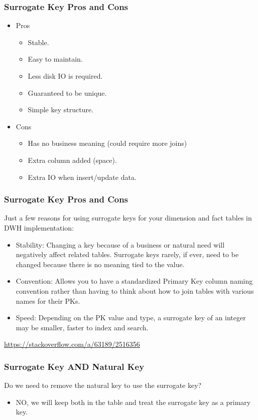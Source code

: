 \begin{frame}
	\frametitle{Surrogate Key Pros and Cons}

\hspace{.5cm}
\begin{itemize}
	\item	Pros
	\begin{itemize}
		\item Stable.
		\item Easy to maintain.
		\item Less disk IO is required.
		\item Guaranteed to be unique.
		\item Simple key structure.
	\end{itemize}	
\end{itemize}

\begin{itemize}
	\item	Cons
	\begin{itemize}
		\item Has no business meaning (could require more joins)
		\item Extra column added (space).
		\item Extra IO when insert/update data.
	\end{itemize}	
\end{itemize}	
\end{frame}

\begin{frame}
\frametitle{Surrogate Key Pros and Cons}
\vspace{.5cm}
Just a few reasons for using surrogate keys for your dimension and fact tables in DWH implementation:
	\begin{itemize}[<+->]
	\item Stability: Changing a key because of a business or natural need will negatively affect related tables. Surrogate keys rarely, if ever, need to be changed because there is no meaning tied to the value.
	
	\item Convention: Allows you to have a standardized Primary Key column naming convention rather than having to think about how to join tables with various names for their PKs.
	
	\item Speed: Depending on the PK value and type, a surrogate key of an integer may be smaller, faster to index and search.
	
\end{itemize}	

\href{https://stackoverflow.com/a/63189/2516356}{https://stackoverflow.com/a/63189/2516356}

\end{frame}

\begin{frame}
	\frametitle{Surrogate Key AND Natural Key}
	\vspace{.5cm}
	Do we need to remove the natural key to use the surrogate key?
	\begin{itemize}[<+->]
		\item NO, we will keep both in the table and treat the surrogate key as a primary key. 
	\end{itemize}	
	
\end{frame}